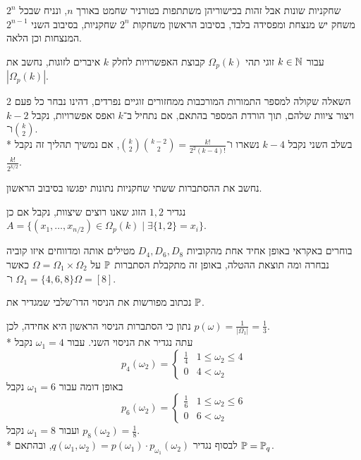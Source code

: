 \Question{}
$2^n$ שחקניות שונות אבל זהות בכישוריהן משתתפות בטורניר שחמט באורך $n$, ונניח שבכל משחק יש מנצחת ומפסידה בלבד, בסיבוב הראשון משחקות $2^n$ שחקניות, בסיבוב השני $2^{n - 1}$ המנצחות וכן הלאה.

\Subquestion{}
עבור $k \in \mathbb{N}$ זוגי תהי $\Omega_p(k)$ קבוצת האפשרויות לחלק $k$ איברים לזוגות, נחשב את $|\Omega_p(k)|$.
\begin{solution}
	השאלה שקולה למספר התמורות המורכבות ממחזורים זוגיים נפרדים, דהינו נבחר כל פעם 2 ויצור ציוות שלהם, תוך הורדת המספר בהתאם, אם נתחיל ב־$k$ ואפס אפשרויות, נקבל $k - 2$ ו־$\binom{k}{2}$. \\*
	בשלב השני נקבל $k - 4$ נשארו ו־$\binom{k}{2} \binom{k - 2}{2} = \frac{k!}{2^2 (k - 4)!}$, אם נמשיך תהליך זה נקבל $\frac{k!}{2^{k / 2}}$.
\end{solution}

\Subquestion{}
נחשב את ההסתברות ששתי שחקניות נתונות יפגשו בסיבוב הראשון.
\begin{solution}
	נגדיר $1, 2$ הזוג שאנו רוצים שיצוות, נקבל אם כן $A = \{ (x_1, \dots, x_{n / 2}) \in \Omega_p(k) \mid \exists \{ 1, 2 \} = x_i \}$.
\end{solution}

\Question{}
בוחרים באקראי באופן אחיד אחת מהקוביות $D_4, D_6, D_8$ מטילים אותה ומדווחים איזו קוביה נבחרה ומה תוצאת ההטלה, באופן זה מתקבלת הסתברות $\mathbb{P}$ על $\Omega = \Omega_1 \times \Omega_2$ כאשר $\Omega_1 = \{ 4, 6, 8 \}$ ו־$\Omega = [8]$.

\Subquestion{}
נכתוב מפורשות את הניסוי הדו־שלבי שמגדיר את $\mathbb{P}$.
\begin{solution}
	נתון כי הסתברות הניסוי הראשון היא אחידה, לכן $p(\omega) = \frac{1}{|\Omega_1|} = \frac{1}{3}$. \\*
	עתה נגדיר את הניסוי השני.
	עבור $\omega_1 = 4$ נקבל
	\[
		p_4(\omega_2) = \begin{cases}
			\frac{1}{4} & 1 \le \omega_2 \le 4 \\
			0 & 4 < \omega_2
		\end{cases}
	\]
	באופן דומה עבור $\omega_1 = 6$ נקבל
	\[
		p_6(\omega_2) = \begin{cases}
			\frac{1}{6} & 1 \le \omega_2 \le 6 \\
			0 & 6 < \omega_2
		\end{cases}
	\]
	ועבור $\omega_1 = 8$ נקבל $p_8(\omega_2) = \frac{1}{8}$. \\*
	לבסוף נגדיר $q(\omega_1, \omega_2) = p(\omega_1) \cdot p_{\omega_1}(\omega_2)$, ובהתאם $\mathbb{P} = \mathbb{P}_q$.
\end{solution}


